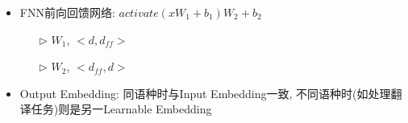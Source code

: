 \begin{multicols}{2}
\begin{itemize}
        \item FNN前向回馈网络: $activate(xW_1+b_1)W_2+b_2$
        \begin{itemize}
            \item [$\triangleright$] $W_1$, $<d, d_{ff}>$
            \item [$\triangleright$] $W_2$, $<d_{ff}, d>$
        \end{itemize}
         
        \item Output Embedding: 同语种时与Input Embedding一致, 不同语种时(如处理翻译任务)则是另一Learnable Embedding
    \end{itemize}
\end{multicols}
